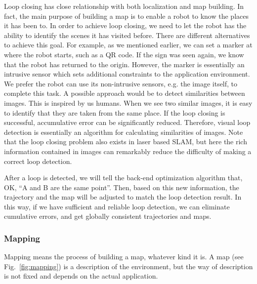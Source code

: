 Loop closing has close relationship with both localization and map building. In fact, the main purpose of building a map is to enable a robot to know the places it has been to. In order to achieve loop closing, we need to let the robot has the ability to identify the scenes it has visited before. There are different alternatives to achieve this goal. For example, as we mentioned earlier, we can set a marker at where the robot starts, such as a QR code. If the sign was seen again, we know that the robot has returned to the origin. However, the marker is essentially an intrusive sensor which sets additional constraints to the application environment. We prefer the robot can use its non-intrusive sensors, e.g. the image itself, to complete this task. A possible approach would be to detect similarities between images. This is inspired by us humans. When we see two similar images, it is easy to identify that they are taken from the same place. If the loop closing is successful, accumulative error can be significantly reduced. Therefore, visual loop detection is essentially an algorithm for calculating similarities of images. Note that the loop closing problem also exists in laser based SLAM, but here the rich information contained in images can remarkably reduce the difficulty of making a correct loop detection.

After a loop is detected, we will tell the back-end optimization algorithm that, OK,  ``A and B are the same point''. Then, based on this new information, the trajectory and the map will be adjusted to match the loop detection result. In this way, if we have sufficient and reliable loop detection, we can eliminate cumulative errors, and get globally consistent trajectories and maps.

\subsubsection{Mapping}
Mapping means the process of building a map, whatever kind it is. A map (see Fig.~\ref{fig:mapping}) is a description of the environment, but the way of description is not fixed and depends on the actual application.

